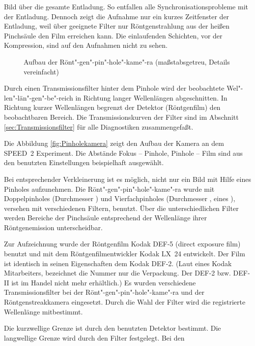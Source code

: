 Bild über die gesamte Entladung. So entfallen alle
Synchronisationsprobleme mit der Entladung. Dennoch zeigt die
Aufnahme nur ein kurzes Zeitfenster der Entladung, weil über
geeignete Filter nur Röntgenstrahlung aus der heißen Pinchsäule
den Film erreichen kann. Die einlaufenden Schichten, vor der
Kompression, sind auf den Aufnahmen nicht zu sehen.
%
\par
\begin{figure}[H]
  \center
  \caption{Aufbau der Rönt"-gen"-pin"-hole"-kame"-ra (maßstabsgetreu, Details vereinfacht)}
  \label{fig:Pinholekamera}
\end{figure}
\par
%
Durch einen Transmissionsfilter hinter dem Pinhole wird der
beobachtete Wel"-len"-län"-gen"-be"-reich in Richtung langer
Wellenlängen abgeschnitten. In Richtung kurzer Wellenlängen
begrenzt der Detektor (Röntgenfilm) den beobachtbaren Bereich. Die
Transmissionskurven der Filter sind im Abschnitt
\vref{sec:Transmissionsfilter} für alle Diagnostiken
zusammengefaßt.
\par
Die Abbildung \vref{fig:Pinholekamera} zeigt den Aufbau der Kamera
an dem SPEED~2 Experiment. Die Abstände Fokus -- Pinhole, Pinhole
-- Film sind aus den benutzten Einstellungen beispielhaft
ausgewählt.
\par
Bei entsprechender Verkleinerung ist es möglich, nicht nur ein
Bild mit Hilfe eines Pinholes aufzunehmen. Die
Rönt"-gen"-pin"-hole"-kame"-ra wurde mit Doppelpinholes
(Durchmesser ) und Vierfachpinholes (Durchmesser
, eines ), versehen mit
verschiedenen Filtern, benutzt. Über die unterschiedlichen Filter
werden Bereiche der Pinchsäule entsprechend der Wellenlänge ihrer
Röntgenemission unterscheidbar.
\par
Zur Aufzeichnung wurde der Röntgenfilm Kodak DEF-5 (direct
exposure film) benutzt und mit dem Röntgenfilmentwickler Kodak
LX~24 entwickelt. Der Film ist identisch in seinen Eigenschaften
dem Kodak DEF-2. (Laut eines Kodak Mitarbeiters, bezeichnet die
Nummer nur die Verpackung. Der DEF-2 bzw. DEF-II ist im Handel
nicht mehr erhältlich.)
%
\label{sec:Transmissionsfilter}
%
Es wurden verschiedene Transmissionsfilter bei der
Rönt"-gen"-pin"-hole"-kame"-ra und der Röntgenstreakkamera
eingesetzt. Durch die Wahl der Filter wird die registrierte
Wellenlänge mitbestimmt.
\par
Die kurzwellige Grenze ist durch den benutzten Detektor bestimmt. Die
langwellige Grenze wird durch den Filter festgelegt. Bei den
